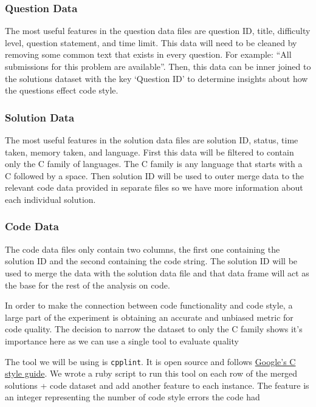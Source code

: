 \documentclass{article}
\begin{document}
\subsubsection{Question Data}\label{question-data}

The most useful features in the question data files are question ID,
title, difficulty level, question statement, and time limit. This data
will need to be cleaned by removing some common text that exists in
every question. For example: ``All submissions for this problem are
available''. Then, this data can be inner joined to the solutions
dataset with the key `Question ID' to determine insights about how the
questions effect code style.

\subsubsection{Solution Data}\label{solution-data}

The most useful features in the solution data files are solution ID,
status, time taken, memory taken, and language. First this data will be
filtered to contain only the C family of languages. The C family is any
language that starts with a C followed by a space. Then solution ID will
be used to outer merge data to the relevant code data provided in
separate files so we have more information about each individual
solution.

\subsubsection{Code Data}\label{code-data}

The code data files only contain two columns, the first one containing
the solution ID and the second containing the code string. The solution
ID will be used to merge the data with the solution data file and that
data frame will act as the base for the rest of the analysis on code.

In order to make the connection between code functionality and code
style, a large part of the experiment is obtaining an accurate and
unbiased metric for code quality. The decision to narrow the dataset to
only the C family shows it's importance here as we can use a single tool
to evaluate quality

The tool we will be using is \texttt{cpplint}. It is open source and
follows
\href{https://google.github.io/styleguide/cppguide.html}{Google's C
style guide}. We wrote a ruby script to run this tool on each row of the
merged solutions + code dataset and add another feature to each
instance. The feature is an integer representing the number of code
style errors the code had
\end{document}

